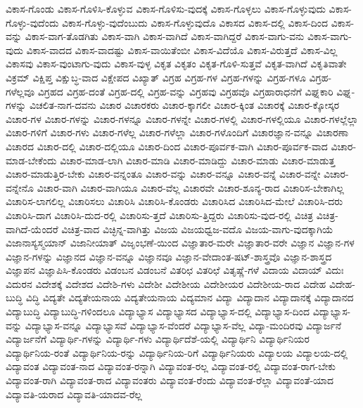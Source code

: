 {ವಿಕಾಸ-ಗೊಂಡು
ವಿಕಾಸ-ಗೊಳಿಸಿ-ಕೊಳ್ಳುವ
ವಿಕಾಸ-ಗೊಳಿಸು-ವುದಕ್ಕೆ
ವಿಕಾಸ-ಗೊಳ್ಳಲು
ವಿಕಾಸ-ಗೊಳ್ಳುವುದು
ವಿಕಾಸ-ಗೊಳ್ಳು-ವುದೆಂದು
ವಿಕಾಸ-ಗೊಳ್ಳು-ವುದೆಂಬುದು
ವಿಕಾಸ-ಗೊಳ್ಳುವುದೊ
ವಿಕಾಸದ
ವಿಕಾಸ-ದಲ್ಲಿ
ವಿಕಾಸ-ದಿಂದ
ವಿಕಾಸ-ವನ್ನು
ವಿಕಾಸ-ವಾಗ-ತೊಡಗಿತು
ವಿಕಾಸ-ವಾಗಿ
ವಿಕಾಸ-ವಾಗಿದೆ
ವಿಕಾಸ-ವಾಗಿದ್ದರೆ
ವಿಕಾಸ-ವಾಗು-ವನು
ವಿಕಾಸ-ವಾಗು-ವುದು
ವಿಕಾಸ-ವಾದದ
ವಿಕಾಸ-ವಾದಷ್ಟು
ವಿಕಾಸ-ವಾಯಿತೆಂಬೀ
ವಿಕಾಸ-ವಿದೆಯೊ
ವಿಕಾಸ-ವಿರುತ್ತದೆ
ವಿಕಾಸ-ವಿಲ್ಲ
ವಿಕಾಸವು
ವಿಕಾಸ-ವುಂಟಾಗು-ವುದು
ವಿಕಾಸ-ವುಳ್ಳ
ವಿಕೃತ
ವಿಕೃತಂ
ವಿಕೃತ-ಗೊಳಿ-ಸುತ್ತವೆ
ವಿಕೃತ-ವಾಗಿದೆ
ವಿಕೃತಿವಾತೇ
ವಿಕ್ರಮ್
ವಿಕ್ಷಿಪ್ತ
ವಿಕ್ಷುಬ್ಧ-ವಾದ
ವಿಕ್ಷೇಪದ
ವಿಖ್ಯಾತ್
ವಿಗ್ರಹ
ವಿಗ್ರಹ-ಗಳ
ವಿಗ್ರಹ-ಗಳನ್ನು
ವಿಗ್ರಹ-ಗಳೂ
ವಿಗ್ರಹ-ಗಳೆಲ್ಲವೂ
ವಿಗ್ರಹದ
ವಿಗ್ರಹ-ದಂತೆ
ವಿಗ್ರಹ-ದಲ್ಲಿ
ವಿಗ್ರಹ-ವನ್ನು
ವಿಗ್ರಹವು
ವಿಗ್ರಹವೊ
ವಿಗ್ರಹಾರಾಧನೆಗೆ
ವಿಘ್ನಕಾರಿ
ವಿಘ್ನ-ಗಳನ್ನು
ವಿಚಲಿತ-ನಾಗ-ದವನು
ವಿಚಾರ
ವಿಚಾರಕರು
ವಿಚಾರ-ಕ್ಕಾಗಲೀ
ವಿಚಾರ-ಕ್ಕಿಂತ
ವಿಚಾರಕ್ಕೆ
ವಿಚಾರ-ಕ್ಕೋಸ್ಕರ
ವಿಚಾರ-ಗಳ
ವಿಚಾರ-ಗಳನ್ನು
ವಿಚಾರ-ಗಳನ್ನೂ
ವಿಚಾರ-ಗಳನ್ನೇ
ವಿಚಾರ-ಗಳಲ್ಲಿ
ವಿಚಾರ-ಗಳಲ್ಲಿಯೂ
ವಿಚಾರ-ಗಳಲ್ಲೆಲ್ಲಾ
ವಿಚಾರ-ಗಳಿಗೆ
ವಿಚಾರ-ಗಳು
ವಿಚಾರ-ಗಳೆಲ್ಲ
ವಿಚಾರ-ಗಳೆಲ್ಲಾ
ವಿಚಾರ-ಗಳೊಂದಿಗೆ
ವಿಚಾರಜ್ಞಾನ-ವನ್ನೂ
ವಿಚಾರಣಾ
ವಿಚಾರದ
ವಿಚಾರ-ದಲ್ಲಿ
ವಿಚಾರ-ದಲ್ಲಿಯೂ
ವಿಚಾರ-ದಿಂದ
ವಿಚಾರ-ಪೂರ್ವಕ-ವಾಗಿ
ವಿಚಾರ-ಪೂರ್ವಕ-ವಾದ
ವಿಚಾರ-ಮಾಡ-ಬೇಕೆಂದು
ವಿಚಾರ-ಮಾಡ-ಲಾಗಿ
ವಿಚಾರ-ಮಾಡಿ
ವಿಚಾರ-ಮಾಡಿದ್ದು
ವಿಚಾರ-ಮಾಡು
ವಿಚಾರ-ಮಾಡುತ್ತ
ವಿಚಾರ-ಮಾಡುತ್ತಿರ-ಬೇಕು
ವಿಚಾರ-ವನ್ನಂತೂ
ವಿಚಾರ-ವನ್ನು
ವಿಚಾರ-ವನ್ನೂ
ವಿಚಾರ-ವನ್ನೆ
ವಿಚಾರ-ವನ್ನೇ
ವಿಚಾರ-ವನ್ನೇನೊ
ವಿಚಾರ-ವಾಗಿ
ವಿಚಾರ-ವಾಗಿಯೂ
ವಿಚಾರ-ವೆಲ್ಲ
ವಿಚಾರವೇ
ವಿಚಾರ-ಶೂನ್ಯ-ರಾದ
ವಿಚಾರಿಸ-ಬೇಕಾಗಿಲ್ಲ
ವಿಚಾರಿಸ-ಲಾಗಲಿಲ್ಲ
ವಿಚಾರಿಸಲು
ವಿಚಾರಿಸಿ
ವಿಚಾರಿಸಿ-ಕೊಂಡರು
ವಿಚಾರಿಸಿದ
ವಿಚಾರಿಸಿದ-ಮೇಲೆ
ವಿಚಾರಿಸಿ-ದರು
ವಿಚಾರಿಸಿ-ದಾಗ
ವಿಚಾರಿಸಿ-ದುದ-ರಲ್ಲಿ
ವಿಚಾರಿಸು-ತ್ತದೆ
ವಿಚಾರಿಸು-ತ್ತಿದ್ದರು
ವಿಚಾರಿಸು-ವುದ-ರಲ್ಲಿ
ವಿಚಿತ್ರ
ವಿಚಿತ್ರ-ವಾಗಿದೆ-ಯೆಂದರೆ
ವಿಚಿತ್ರ-ವಾದ
ವಿಚ್ಛಿನ್ನ-ವಾಗಿತ್ತು
ವಿಜಯ
ವಿಜಯಧ್ವಜ-ವದೊ
ವಿಜಯ-ವಾಗು-ವುದಕ್ಕಾಗಿಯೆ
ವಿಜಾನಾಸ್ಯಸ್ಮಯಾನ್
ವಿಜಾನೀಯಾತ್
ವಿಜೃಂಭಣೆ-ಯಿಂದ
ವಿಜ್ಞಾತಾರ-ಮರೇ
ವಿಜ್ಞಾತಾರ-ವರೇ
ವಿಜ್ಞಾನ
ವಿಜ್ಞಾನ-ಗಳ
ವಿಜ್ಞಾನ-ಗಳನ್ನು
ವಿಜ್ಞಾನದ
ವಿಜ್ಞಾನ-ವನ್ನೂ
ವಿಜ್ಞಾನವೂ
ವಿಜ್ಞಾನ-ವೇದಾಂತ-ಷಟ್-ಶಾಸ್ತ್ರವೊ
ವಿಜ್ಞಾನ-ಶಾಸ್ತ್ರದ
ವಿಜ್ಞಾಪನ
ವಿಜ್ಞಾಪಿಸಿ-ಕೊಂಡರು
ವಿಡಂಬನ
ವಿಡಂಬನೆ
ವಿತರಿಛ
ವಿತರಿಛೆ
ವಿತೃಷ್ಣೆ-ಗಳೆ
ವಿದಾಯ
ವಿದಾಯ್
ವಿದುಃ
ವಿದುರನ
ವಿದೇಶಕ್ಕೆ
ವಿದೇಶದ
ವಿದೇಶಿ-ಗಳು
ವಿದೇಶೀ
ವಿದೇಶೀಯ
ವಿದೇಶೀಯರ
ವಿದೇಶೀಯ-ರಾದ
ವಿದೇಹ
ವಿದೇಹ-ಬುದ್ಧಿ
ವಿದ್ಧಿ
ವಿದ್ಯತೇ
ವಿದ್ಯತೇಯನಾಯ
ವಿದ್ಯತೇಯನಾಯ
ವಿದ್ಯಮಾನ
ವಿದ್ಯಾ
ವಿದ್ಯಾದಾನ
ವಿದ್ಯಾದಾನಕ್ಕೆ
ವಿದ್ಯಾದಾನದ
ವಿದ್ಯಾಬುದ್ಧಿ
ವಿದ್ಯಾಬುದ್ಧಿ-ಗಳಿಂದಲೂ
ವಿದ್ಯಾಭ್ಯಾಸ
ವಿದ್ಯಾಭ್ಯಾಸದ
ವಿದ್ಯಾಭ್ಯಾಸ-ದಲ್ಲಿ
ವಿದ್ಯಾಭ್ಯಾಸ-ದಿಂದ
ವಿದ್ಯಾಭ್ಯಾಸ-ವನ್ನು
ವಿದ್ಯಾಭ್ಯಾಸ-ವನ್ನೂ
ವಿದ್ಯಾಭ್ಯಾಸವೆ
ವಿದ್ಯಾಭ್ಯಾಸ-ವೆಂದರೆ
ವಿದ್ಯಾಭ್ಯಾಸ-ವೆಲ್ಲ
ವಿದ್ಯಾ-ಮಂದಿರವು
ವಿದ್ಯಾರ್ಜನೆ
ವಿದ್ಯಾರ್ಜನೆಗೆ
ವಿದ್ಯಾರ್ಥಿ-ಗಳನ್ನು
ವಿದ್ಯಾರ್ಥಿ-ಗಳು
ವಿದ್ಯಾರ್ಥಿದೆಶೆ-ಯಲ್ಲಿ
ವಿದ್ಯಾರ್ಥಿನಿ
ವಿದ್ಯಾರ್ಥಿನಿಯರ
ವಿದ್ಯಾರ್ಥಿನಿಯ-ರಂತೆ
ವಿದ್ಯಾರ್ಥಿನಿಯ-ರನ್ನು
ವಿದ್ಯಾರ್ಥಿನಿಯ-ರಿಗೆ
ವಿದ್ಯಾರ್ಥಿನಿಯರು
ವಿದ್ಯಾಲಯ
ವಿದ್ಯಾಲಯ-ದಲ್ಲಿ
ವಿದ್ಯಾವಂತ
ವಿದ್ಯಾವಂತ-ನಾದ
ವಿದ್ಯಾವಂತ-ರನ್ನಾಗಿ
ವಿದ್ಯಾವಂತ-ರಲ್ಲ
ವಿದ್ಯಾವಂತ-ರಲ್ಲಿ
ವಿದ್ಯಾವಂತ-ರಾಗ-ಬೇಕು
ವಿದ್ಯಾವಂತ-ರಾಗಿ
ವಿದ್ಯಾವಂತ-ರಾದ
ವಿದ್ಯಾವಂತರು
ವಿದ್ಯಾವಂತ-ರೆಂದು
ವಿದ್ಯಾವಂತ-ರೆಲ್ಲಾ
ವಿದ್ಯಾವಂತೆ-ಯಾದ
ವಿದ್ಯಾವತಿ-ಯರಾದ
ವಿದ್ಯಾವತಿ-ಯಾದವ-ರೆಲ್ಲ
}
